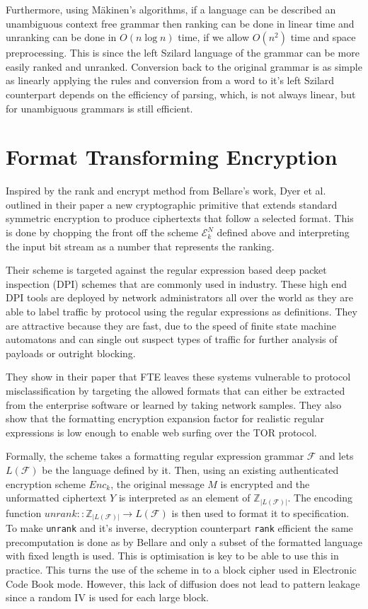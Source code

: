 \documentclass[10pt,a4paper]{article}
\begin{document}
Furthermore, using M\"akinen's\cite{rankcf} algorithms, if a language can be described an unambiguous context free grammar then ranking can be done in linear time and unranking can be done in $O(n \log n)$ time, if we allow $O(n^2)$ time and space preprocessing. This is since the left Szilard language of the grammar can be more easily ranked and unranked. Conversion back to the original grammar is as simple as linearly applying the rules and conversion from a word to it's left Szilard counterpart depends on the efficiency of parsing, which, is not always linear, but for unambiguous grammars is still efficient.

\section{Format Transforming Encryption}\label{sec:FTE}

Inspired by the rank and encrypt method from Bellare's work, Dyer et al. outlined in their paper\cite{fte} a new cryptographic primitive that extends standard symmetric encryption to produce ciphertexts that follow a selected format. This is done by chopping the front off the scheme $\mathcal{E}^N_k$ defined above and interpreting the input bit stream as a number that represents the ranking.

Their scheme is targeted against the regular expression based deep packet inspection (DPI) schemes that are commonly used in industry. These high end DPI tools are deployed by network administrators all over the world as they are able to label traffic by protocol using the regular expressions as definitions. They are attractive because they are fast, due to the speed of finite state machine automatons and can single out suspect types of traffic for further analysis of payloads or outright blocking.

They show in their paper that FTE leaves these systems vulnerable to protocol misclassification by targeting the allowed formats that can either be extracted from the enterprise software or learned by taking network samples. They also show that the formatting encryption expansion factor for realistic regular expressions is low enough to enable web surfing over the TOR protocol.

Formally, the scheme takes a formatting regular expression grammar $\mathcal{F}$ and lets $L(\mathcal{F})$ be the language defined by it. Then, using an existing authenticated encryption scheme $Enc_k$, the original message $M$ is encrypted and the unformatted ciphertext $Y$ is interpreted as an element of $\mathbb{Z}_{\vert L(\mathcal{F}) \vert}$. The encoding function $unrank :: \mathbb{Z}_{\vert L(\mathcal{F}) \vert} \rightarrow L(\mathcal{F})$ is then used to format it to specification. To make \texttt{unrank} and it's inverse, decryption counterpart \texttt{rank} efficient the same precomputation is done as by Bellare and only a subset of the formatted language with fixed length is used. This is optimisation is key to be able to use this in practice. This turns the use of the scheme in to a block cipher used in Electronic Code Book mode. However, this lack of diffusion does not lead to pattern leakage since a random IV is used for each large block.
\end{document}
